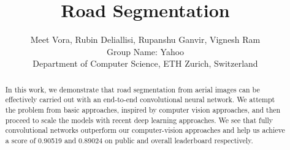 \documentclass[10pt,conference,compsocconf]{IEEEtran}
\begin{document}
\title{Road Segmentation}

\author{
  Meet Vora, Rubin Deliallisi, Rupanshu Ganvir, Vignesh Ram \\
  Group Name: Yahoo \\
  Department of Computer Science, ETH Zurich, Switzerland
}

\maketitle

\begin{abstract}
In this work, we demonstrate that road segmentation from aerial images can be effectively carried out with an end-to-end convolutional neural network. We attempt the problem from basic approaches, inspired by computer vision approaches, and then proceed to scale the models with recent deep learning approaches. We see that fully convolutional networks outperform our computer-vision approaches and help us achieve a score of 0.90519 and 0.89024 on public and overall leaderboard respectively. 
\end{abstract}










\end{document}
